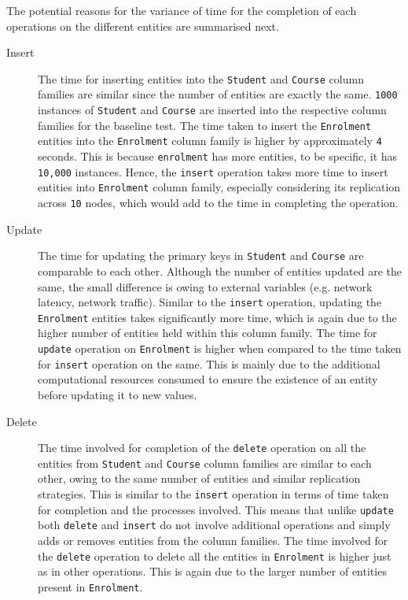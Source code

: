 	The potential reasons for the variance of time for the completion of each
	operations on the different entities are summarised next.
	\begin{description}
	\item[Insert] The time for inserting entities into the \texttt{Student} and
	\texttt{Course} column families are similar since the number of entities are
	exactly the same.
	\texttt{1000} instances of \texttt{Student} and \texttt{Course} are inserted
	into the respective column families for the baseline test. The time taken to
	insert the \texttt{Enrolment} entities into the \texttt{Enrolment} column family
	is higher by approximately \texttt{4} seconds. This is because
	\texttt{enrolment} has more entities, to be specific, it has \texttt{10,000}
	instances. Hence, the \texttt{insert} operation takes more time to insert
	entities into \texttt{Enrolment} column family, especially considering its
	replication across \texttt{10} nodes, which would add to the time in
	completing the operation.
	
	\item[Update] The time for updating the primary keys in \texttt{Student} and
	\texttt{Course} are comparable to each other. Although the number of entities
	updated are the same, the small difference is owing to external variables
	(e.g. network latency, network traffic). Similar to the \texttt{insert}
	operation, updating the \texttt{Enrolment} entities takes significantly more
	time, which is again due to the higher number of entities held within this
	column family. The time for \texttt{update} operation on \texttt{Enrolment} is
	higher when compared to the time taken for \texttt{insert} operation on the
	same. This is mainly due to the additional computational resources consumed to
	ensure the existence of an entity before updating it to new values.
	
	\item[Delete] The time involved for completion of the \texttt{delete} operation
	on all the entities from \texttt{Student} and \texttt{Course} column families are
	similar to each other, owing to the same number of entities and similar
	replication strategies. This is similar to the \texttt{insert} operation in
	terms of time taken for completion and the processes involved. This means that
	unlike \texttt{update} both \texttt{delete} and \texttt{insert} do not
	involve additional operations and simply adds or removes entities from the
	column families.
	The time involved for the \texttt{delete} operation to delete all the entities
	in \texttt{Enrolment} is higher just as in other operations. This is again due
	to the larger number of entities present in \texttt{Enrolment}.
	\end{description}

